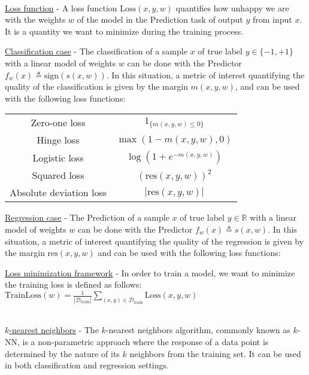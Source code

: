 \documentclass[4pt,landscape]{article}
\begin{document}
\begin{multicols*}{4}
{\color{black}\hrulefill}\\
{\tiny \underline{Loss function} - A loss function $\textrm{Loss}(x,y,w)$ quantifies how unhappy we are with the weights $w$ of the model in the Prediction task of output $y$ from input $x$. It is a quantity we want to minimize during the training process.}

{\tiny \underline{Classification case} - The classification of a sample $x$ of true label $y\in \{-1,+1\}$ with a linear model of weights $w$ can be done with the Predictor $f_w(x) \triangleq \textrm{sign}(s(x,w))$. In this situation, a metric of interest quantifying the quality of the classification is given by the margin $m(x,y,w)$, and can be used with the following loss functions:}\par
\begin{tabular}{c | c }
\hline
Zero-one loss &\tiny$ 1_{\{m(x,y,w) \leqslant 0\}}$\\
Hinge loss & \tiny$ \max(1-m(x,y,w), 0)$\\
Logistic loss&\tiny$ \log(1+e^{-m(x,y,w)})$\\
Squared loss&\tiny$ (\textrm{res}(x,y,w))^2$\\
Absolute deviation loss&\tiny$ |\textrm{res}(x,y,w)|$
	
\end{tabular}

{\underline{Regression case} - \tiny The Prediction of a sample $x$ of true label $y \in \mathbb{R}$ with a linear model of weights $w$ can be done with the Predictor $f_w(x) \triangleq s(x,w)$. In this situation, a metric of interest quantifying the quality of the regression is given by the margin $\textrm{res}(x,y,w)$ and can be used with the following loss functions:}\par

{\underline{Loss minimization framework} - In order to train a model, we want to minimize the training loss is defined as follows: \tiny${\textrm{TrainLoss}(w)=\frac{1}{|\mathcal{D}_{\textrm{train}}|}\sum_{(x,y)\in\mathcal{D}_{\textrm{train}}}\textrm{Loss}(x,y,w)}$}

{\color{black}\hrulefill}\\
{\tiny \underline{$k$-nearest neighbors} - The $k$-nearest neighbors algorithm, commonly known as $k$-NN, is a non-parametric approach where the response of a data point is determined by the nature of its $k$ neighbors from the training set. It can be used in both classification and regression settings.}\par


\end{multicols*}
\end{document}
